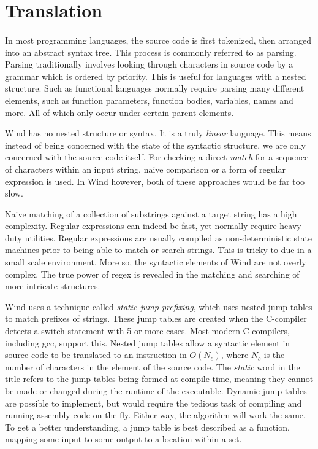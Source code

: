 \section{Translation}

\paragraph{  } In most programming languages, the source code is first tokenized, then arranged into an abstract syntax tree. This process is commonly referred to as parsing. Parsing traditionally involves looking through characters in source code by a grammar which is ordered by priority. This is useful for languages with a nested structure. Such as functional languages normally require parsing many different elements, such as function parameters, function bodies, variables, names and more. All of which only occur under certain parent elements.
\par Wind has no nested structure or syntax. It is a truly \emph{linear} language. This means instead of being concerned with the state of the syntactic structure, we are only concerned with the source code itself. For checking a direct \emph{match} for a sequence of characters within an input string, naive comparison or a form of regular expression is used. In Wind however, both of these approaches would be far too slow.
\par Naive matching of a collection of substrings against a target string has a high complexity. Regular expressions can indeed be fast, yet normally require heavy duty utilities. Regular expressions are usually compiled as non-deterministic state machines prior to being able to match or search strings. This is tricky to due in a small scale environment. More so, the syntactic elements of Wind are not overly complex. The true power of regex is revealed in the matching and searching of more intricate structures.
\par Wind uses a technique called \emph{static jump prefixing}, which uses nested jump tables to match prefixes of strings. These jump tables are created when the C-compiler detects a switch statement with 5 or more cases. Most modern C-compilers, including gcc, support this. Nested jump tables allow a syntactic element in source code to be translated to an instruction in $O(N_c)$, where $N_c$ is the number of characters in the element of the source code. The \emph{static} word in the title refers to the jump tables being formed at compile time, meaning they cannot be made or changed during the runtime of the executable. Dynamic jump tables are possible to implement, but would require the tedious task of compiling and running assembly code on the fly. Either way, the algorithm will work the same. To get a better understanding, a jump table is best described as a function, mapping some input to some output to a location within a set.

